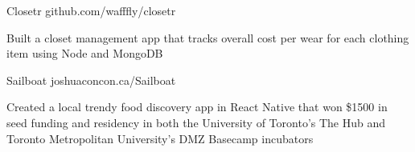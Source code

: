\begin{cventries}
  \cventry
    {}
    {Closetr}
    {}
    {github.com/wafffly/closetr}
    {}
    {
      \begin{cvitems}
        \item {Built a closet management app that tracks overall cost per wear for each clothing item using Node and MongoDB}
      \end{cvitems}
    }
  \cventry
    {}
    {Sailboat}
    {}
    {joshuaconcon.ca/Sailboat}
    {}
    {
      \begin{cvitems}
        \item {Created a local trendy food discovery app in React Native that won \$1500 in seed funding and residency in both the University of Toronto's The Hub and Toronto Metropolitan University's DMZ Basecamp incubators}
      \end{cvitems}
    }
\end{cventries}